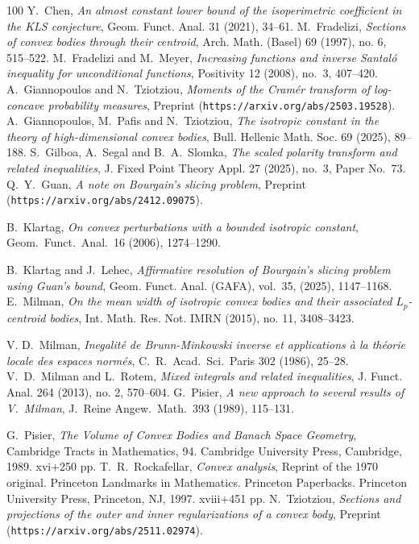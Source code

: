 \documentclass[11pt,leqno]{article}
\theoremstyle{definition}
\theoremstyle{remark}
\numberwithin{equation}{section}
\begin{document}
\begin{thebibliography}{100}
 \textrm{Y.~Chen,} \textit{An almost constant lower bound of the isoperimetric coefficient in the KLS conjecture},
Geom. Funct. Anal. {31} (2021), 34--61.
 {\rm M.\ Fradelizi}, \textit{Sections of convex bodies through their centroid},
Arch. Math. (Basel) 69 (1997), no. 6, 515--522.
 \textrm{M.\ Fradelizi and M.\ Meyer}, \textit{Increasing functions and inverse Santal\'{o} 
inequality for unconditional functions}, Positivity 12 (2008), no.~3, 407--420.
 \textrm{A.\ Giannopoulos and N.\ Tziotziou}, \textit{Moments of the Cram\'{e}r
transform of log-concave probability measures}, Preprint ({\tt https://arxiv.org/abs/2503.19528}).
 \textrm{A.\ Giannopoulos, M.\ Pafis and N.\ Tziotziou}, 
\textit{The isotropic constant in the theory of high-dimensional convex bodies}, Bull. Hellenic Math. Soc. 69 (2025), 89--188.
 \textrm{S.\ Gilboa, A.\ Segal and B.\ A.\ Slomka}, \textit{The scaled polarity transform 
and related inequalities}, J. Fixed Point Theory Appl. 27 (2025), no.~3, Paper No.~73.
 \textrm{Q.~Y.~Guan}, \textit{A note on Bourgain's slicing problem},
Preprint ({\tt https://arxiv.org/abs/2412.09075}).


 \textrm{B.\ Klartag},
\textit{On convex perturbations with a bounded isotropic constant},
Geom.\ Funct.\ Anal.\ 16 (2006), 1274--1290.

 \textrm{B.~Klartag and J.~Lehec}, \textit{Affirmative resolution of Bourgain's slicing problem using
Guan's bound}, Geom. Funct. Anal. (GAFA), vol.~35, (2025), 1147--1168.
 \textrm{E.\ Milman}, \textit{On the mean width of isotropic convex bodies and
their associated $L_p$-centroid bodies}, Int. Math. Res. Not. IMRN (2015), no. 11, 3408--3423.

 \textrm{V. D.\ Milman}, \textit{Inegalit\'{e} de Brunn-Minkowski inverse et applications \`{a} la th\'{e}orie
locale des espaces norm\'{e}s}, C.~R.~Acad.~Sci.~Paris {302} (1986), 25--28.
 {\rm V.~D.~Milman and L.~Rotem}, \textit{Mixed integrals and related inequalities}, J. Funct. Anal.
{264} (2013), no. 2, 570--604.
 \textrm{G.\ Pisier}, \textit{A new approach to several results of V.\ Milman},
J.\ Reine Angew.\ Math.\ 393 (1989), 115--131.

 \textrm{G.\ Pisier}, \textit{The Volume of Convex Bodies and Banach Space Geometry},
Cambridge Tracts in Mathematics, 94. Cambridge University Press, Cambridge, 1989. xvi+250 pp.
 \textrm{T.~R.~Rockafellar}, \textit{Convex analysis}, 
Reprint of the 1970 original. Princeton Landmarks in Mathematics. Princeton Paperbacks. Princeton University Press, 
Princeton, NJ, 1997. xviii+451 pp. 
 \textrm{N.\ Tziotziou}, \textit{Sections and projections of the outer and inner regularizations of a convex body},
Preprint ({\tt https://arxiv.org/abs/2511.02974}).

\end{thebibliography}
\end{document}
